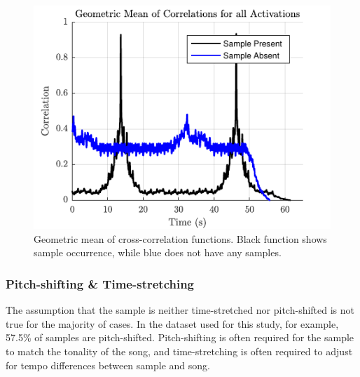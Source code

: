 \documentclass{article}
\begin{document}

\begin{figure}[t]
\centering
\includegraphics[width=\linewidth]{correlation.pdf}
\caption{Geometric mean of cross-correlation functions. Black function shows sample occurrence, while blue does not have any samples.}
\label{fig1}
\end{figure}

\subsubsection{Pitch-shifting \& Time-stretching}
The assumption that the sample is neither time-stretched nor pitch-shifted is not true for the majority of cases. In the dataset used for this study, for example, 57.5\% of samples are pitch-shifted. Pitch-shifting is often required for the sample to match the tonality of the song, and time-stretching is often required to adjust for tempo differences between sample and song.

\end{document}
